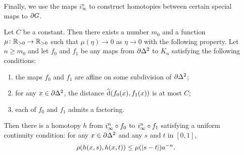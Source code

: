 \documentclass[a4paper]{article}
\begin{document}
Finally, we use the maps $i^n_\infty$ to construct homotopies between certain
special maps to $\partial G$.

\begin{proposition}\label{prop:basic_homotopies}
  Let $C$ be a constant. Then there exists a number $m_0$ and a function $\mu
  \colon \mathbb{R}_{>0}\to\mathbb{R}_{>0}$ such that $\mu(\eta)\to0$ as $\eta\to0$ with the following
  property. Let $n \geq m_0$ and let $f_0$ and $f_1$ be any maps from
  $\partial\Delta^2$ to $K_n$ satisfying the following conditions:
  \begin{enumerate}
    \item the maps $f_0$ and $f_1$ are affine on some subdivision of
      $\partial\Delta^2$;
    \item for any $x \in \partial\Delta^2$, the distance 
      $\operatorname{\widehat{d}}(f_0(x), f_1(x))$ is at most $C$;
    \item each of $f_0$ and $f_1$ admits a factoring.
  \end{enumerate}
  Then there is a homotopy $h$ from $i^n_\infty\circ f_0$ to
  $i^n_\infty\circ f_1$ satisfying a uniform continuity condition: for any
  $x \in \partial\Delta^2$ and any $s$ and $t$ in $[0,1]$,
  \begin{equation*}
    \rho(h(x,s), h(x,t)) \leq \mu(\left|s-t\right|)a^{-n}.
  \end{equation*}
\end{proposition}
\end{document}
